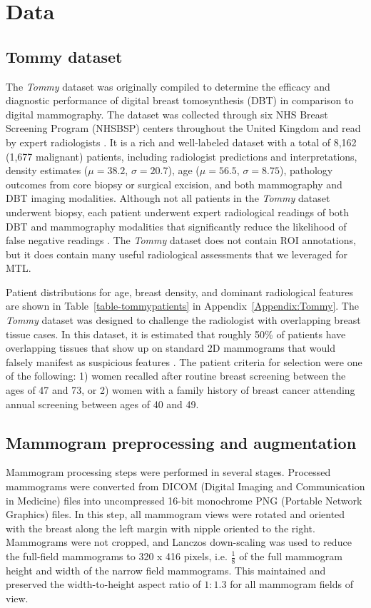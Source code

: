 \documentclass[journal]{IEEEtran}
\begin{document}
\section{Data}

\subsection{Tommy dataset}

The \textit{Tommy} dataset was originally compiled to determine the efficacy and diagnostic performance of digital breast tomosynthesis (DBT) in comparison to digital mammography.  The dataset was collected through six NHS Breast Screening Program (NHSBSP) centers throughout the United Kingdom and read by expert radiologists \cite{tommy-2015}.  It is a rich and well-labeled dataset with a total of 8,162 (1,677 malignant) patients, including radiologist predictions and interpretations, density estimates ($\mu = 38.2$, $\sigma=20.7$), age ($\mu = 56.5$, $\sigma=8.75$), pathology outcomes from core biopsy or surgical excision, and both mammography and DBT imaging modalities.  Although not all patients in the \textit{Tommy} dataset underwent biopsy, each patient underwent expert radiological readings of both DBT and mammography modalities that significantly reduce the likelihood of false negative readings \cite{tommy-2015}.  The \textit{Tommy} dataset does not contain ROI annotations, but it does contain many useful radiological assessments that we leveraged for MTL.  

Patient distributions for age, breast density, and dominant radiological features are shown in Table~\ref{table-tommypatients} in Appendix~\ref{Appendix:Tommy}. The \textit{Tommy} dataset was designed to challenge the radiologist with overlapping breast tissue cases.  In this dataset, it is estimated that roughly 50\% of patients have overlapping tissues that show up on standard 2D mammograms that would falsely manifest as suspicious features \cite{tommy-2015}.  
The patient criteria for selection were one of the following: 1) women recalled after routine breast screening between the ages of 47 and 73, or 2) women with a family history of breast cancer attending annual screening between ages of 40 and 49.

\subsection{Mammogram preprocessing and augmentation}
Mammogram processing steps were performed in several stages.  Processed mammograms were converted from DICOM (Digital Imaging and Communication in Medicine) files into uncompressed 16-bit monochrome PNG (Portable Network Graphics) files.  In this step, all mammogram views were rotated and oriented with the breast along the left margin with nipple oriented to the right.  Mammograms were not cropped, and Lanczos down-scaling was used to reduce the full-field mammograms to 320 x 416 pixels, i.e. $\frac{1}{8}$ of the full mammogram height and width of the narrow field mammograms. This maintained and preserved the width-to-height aspect ratio of $1:1.3$ for all mammogram fields of view.  
\end{document}
